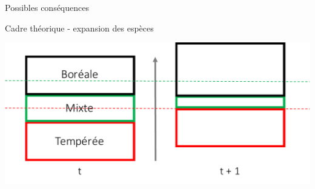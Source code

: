 \documentclass[11pt, compress, aspectratio=1610]{beamer}
\begin{document}
\begin{frame}{Possibles conséquences}
\protect\hypertarget{possibles-consuxe9quences}{}

\vspace*{-15mm}
\begin{center}
\end{center}

\end{frame}

\begin{frame}{Cadre théorique - expansion des espèces}
\protect\hypertarget{cadre-thuxe9orique---expansion-des-espuxe8ces}{}


\includegraphics[scale=0.65]{figures/migration1.pdf}

\end{frame}
\end{document}
